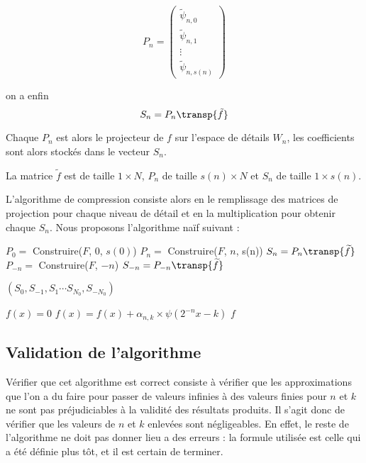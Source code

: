 $$P_n = 
\left(
	\begin{array}{c}
		\widetilde{\psi}_{n, 0} \\
		\widetilde{\psi}_{n, 1} \\
		\vdots \\
		\widetilde{\psi}_{n, s(n)} 
	\end{array}
\right)$$

on a enfin $$S_n = P_n \transp{\tilde{f} }$$

Chaque $P_n$ est alors le projecteur de $f$ sur l'espace de détails $W_n$, les coefficients sont alors stockés dans le vecteur $S_n$.

\begin{myrem}
	La matrice $\widetilde{f}$ est de taille $1 \times N$, $P_n$ de taille $s(n) \times N$ et $S_n$ de taille $1 \times s(n)$.
\end{myrem}

L'algorithme de compression consiste alors en le remplissage des matrices de projection pour chaque niveau de détail et en la multiplication pour obtenir chaque $S_n$. Nous proposons l'algorithme naïf suivant :

\begin{algorithm}
	\begin{algorithmic}[1]
			\State $P_0 = $ Construire($F$, 0, $s(0)$)
				\State $P_n =$ Construire($F$, $n$, s(n))
				\State $S_n = P_n  \transp{\widetilde{f}}$
			    \State $P_{-n} =$ Construire($F$, $-n$)
				\State $S_{-n} = P_{-n} \transp{\widetilde{f}}$
		
			\EndFor
			\State \Return $(S_0, S_{-1}, S_{1} \cdots S_{N_0}, S_{-N_0})$
		\EndProcedure

		\Statex

		\State $f(x) = 0$
		\State $f(x) = f(x) + \alpha_{n, k} \times \psi(2^{-n} x - k)$
		\EndFor
		\EndFor
		\EndFor
		\State \Return $f$
		\EndProcedure
	\end{algorithmic}
\end{algorithm}

\subsection{Validation de l'algorithme}

Vérifier que cet algorithme est correct consiste à vérifier que les approximations que l'on a du faire pour passer de valeurs infinies à des valeurs finies pour $n$ et $k$ ne sont pas préjudiciables à la validité des résultats produits. Il s'agit donc de vérifier que les valeurs de $n$ et $k$ enlevées sont négligeables. En effet,  le reste de l'algorithme ne doit pas donner lieu a des erreurs : la formule utilisée est celle qui a été définie plus tôt, et il est certain de terminer. 

